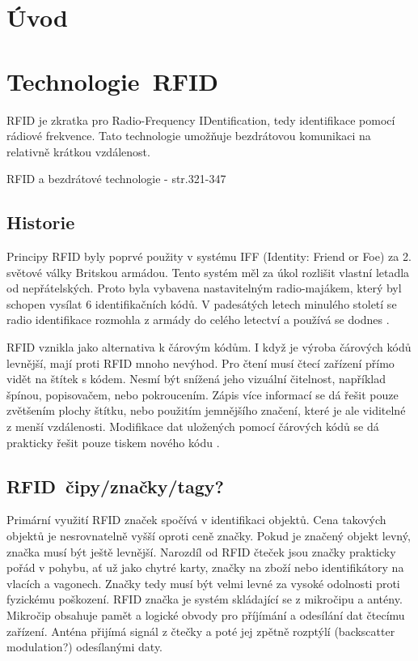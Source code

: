 
\chapter{Úvod}
\label{uvod}

\chapter{Technologie\ RFID}
\label{technologie_rfid}
RFID je zkratka pro {Radio-Frequency IDentification}, tedy identifikace pomocí rádiové frekvence. Tato technologie umožňuje bezdrátovou komunikaci na relativně krátkou vzdálenost\cite{The_RF_in_RFID}.
\par
RFID a bezdrátové technologie \cite{Smart_Cards_Tokens_Security}{ - str.321-347}

\section{Historie}
Principy RFID byly poprvé použity v systému IFF (Identity: Friend or Foe) za 2. světové války Britskou armádou. Tento systém měl za úkol rozlišit vlastní letadla od nepřátelských. Proto byla vybavena nastavitelným {radio-majákem}, který byl schopen vysílat 6 identifikačních kódů. V padesátých letech minulého století se radio identifikace rozmohla z armády do celého letectví a používá se dodnes \cite{The_RF_in_RFID}\cite{Emulator_UHD_RFID_Tagu}.
\par
RFID vznikla jako alternativa k čárovým kódům. I když je výroba čárových kódů levnější, mají proti RFID mnoho nevýhod. Pro čtení musí čtecí zařízení přímo vidět na štítek s kódem. Nesmí být snížená jeho vizuální čitelnost, například špínou, popisovačem, nebo pokroucením. Zápis více informací se dá řešit pouze zvětšením plochy štítku, nebo použitím jemnějšího značení, které je ale viditelné z menší vzdálenosti. Modifikace dat uložených pomocí čárových kódů se dá prakticky řešit pouze tiskem nového kódu \cite{The_RF_in_RFID}\cite{Emulator_UHD_RFID_Tagu}.


\section{RFID\ čipy/značky/tagy?}
Primární využití RFID značek spočívá v identifikaci objektů. Cena takových objektů je nesrovnatelně vyšší oproti ceně značky. Pokud je značený objekt levný, značka musí být ještě levnější. Narozdíl od RFID čteček jsou značky prakticky pořád v pohybu, ať už jako chytré karty, značky na zboží nebo identifikátory na vlacích a vagonech. Značky tedy musí být velmi levné za vysoké odolnosti proti fyzickému poškození\cite{The_RF_in_RFID}.
RFID značka je systém skládající se z mikročipu a antény. Mikročip obsahuje pamět a logické obvody pro příjímání a odesílání dat čtecímu zařízení. Anténa přijímá signál z čtečky a poté jej zpětně rozptýlí (backscatter modulation?) odesílanými daty.

